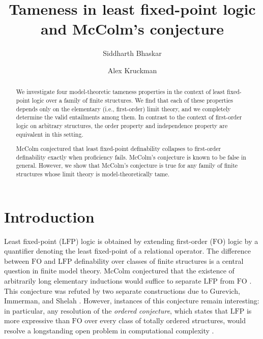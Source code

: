 \documentclass{lmcs}
\newcommand{\LFP}{\mathrm{LFP}}
\newcommand{\FO}{\mathrm{FO}}
\theoremstyle{thmC}
\begin{document}
\title{Tameness in least fixed-point logic and McColm's conjecture}

\begin{abstract}
We investigate four model-theoretic tameness properties in the context of least fixed-point logic over a family of finite structures. We find that each of these properties depends only on the elementary (i.e., first-order) limit theory, and we completely determine the valid entailments among them. In contrast to the context of first-order logic on arbitrary structures, the order property and independence property are equivalent in this setting.

McColm conjectured that least fixed-point definability collapses to first-order definability exactly when proficiency fails. McColm's conjecture is known to be false in general. However, we show that McColm's conjecture is true for any family of finite structures whose limit theory is model-theoretically tame.
\end{abstract}

\author{Siddharth Bhaskar}
\address{Department of Computer Science, University of Copenhagen, Denmark}

\author{Alex Kruckman}
\address{Department of Mathematics and Computer Science, Wesleyan University, USA}


\maketitle

\section{Introduction}

Least fixed-point ($\LFP$) logic is obtained by extending first-order ($\FO$) logic by a quantifier denoting the least fixed-point of a relational operator. The difference between $\FO$ and $\LFP$ definability over classes of finite structures is a central question in finite model theory. McColm conjectured that the existence of arbitrarily long elementary inductions would suffice to separate $\LFP$ from $\FO$ \cite{McC}. This conjecture was refuted by two separate constructions due to Gurevich, Immerman, and Shelah \cite{GIS}. However, instances of this conjecture remain interesting: in particular, any resolution of the \emph{ordered conjecture}, which states that $\LFP$ is more expressive than $\FO$ over every class of totally ordered structures, would resolve a longstanding open problem in computational complexity \cite{KV}.
\end{document}
